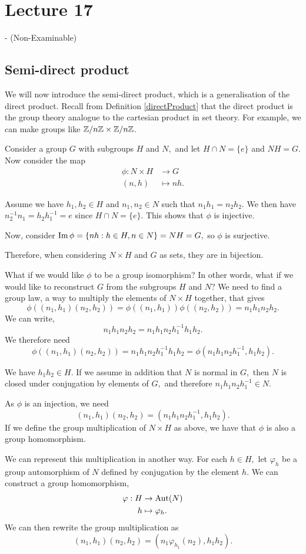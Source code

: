 \section{Lecture 17} - (Non-Examinable)
\subsection{Semi-direct product}
We will now introduce the semi-direct product, which is a generalisation of the direct product. Recall from Definition \ref{directProduct} that the direct product is the
group theory analogue to the cartesian product in set theory. For example, we can make
groups like $\mathbb Z/n\mathbb Z \times \mathbb Z/n\mathbb Z$.

Consider a group $G$ with subgroups $H$ and $N,$ and let $H\cap N = \{e\}$
and $NH=G$. Now consider the map
\begin{align*}
    \phi: N\times H &\to G
    \\ (n,h)&\mapsto nh.
\end{align*}

Assume we have $h_1,h_2\in H$ and $n_1,n_2\in N$ such that $n_1h_1=n_2h_2.$  We then have $n_2^{-1}n_1=h_2h_1^{-1}=e$ since $H\cap N = \{e\}.$ This shows that $\phi$ is injective.

Now, consider $\operatorname{Im} \phi =\{nh:h\in H, n\in N\}=NH=G,$ so $\phi$ is surjective.

Therefore, when considering $N\times H$ and $G$ as sets, they are in bijection.

What if we would like $\phi$ to be a group isomorphism? In other words, what if we would like to reconstruct $G$ from the subgroups $H$ and $N$?
We need to find a group law, a way to multiply the elements of $N\times H$ together, that gives
$$\phi((n_1,h_1)(n_2,h_2))=\phi((n_1,h_1))\phi((n_2,h_2))=n_1h_1n_2h_2.$$
We can write,
$$n_1h_1n_2h_2=n_1h_1n_2h_1^{-1}h_1h_2.$$
We therefore need 
$$\phi((n_1,h_1)(n_2,h_2))=n_1h_1n_2h_1^{-1}h_1h_2=\phi(n_1h_1n_2h_1^{-1},h_1h_2).$$

We have $h_1h_2 \in H$. If we assume in addition that $N$ is normal in $G,$ then $N$ is closed under conjugation by elements of $G,$ and therefore $n_1h_1n_2h_1^{-1}\in N$. 

As $\phi$ is an injection, we need 
$$(n_1,h_1)(n_2,h_2)=(n_1h_1n_2h_1^{-1},h_1h_2).$$
If we define the group multiplication of $N\times H$ as above, we have that $\phi$ is also a group homomorphism.

We can represent this multiplication in another way. For each $h\in H,$ let $\varphi_h$ be a group automorphism of $N$ defined by conjugation by the element $h.$ We can construct a group homomorphism,
\begin{align*}
    \varphi : H &\to \operatorname{Aut}(N)
    \\ h& \mapsto \varphi_h.
\end{align*}
We can then rewrite the group multiplication as 
$$(n_1,h_1)(n_2,h_2)=(n_1\varphi_{h_1}(n_2),h_1h_2).$$

